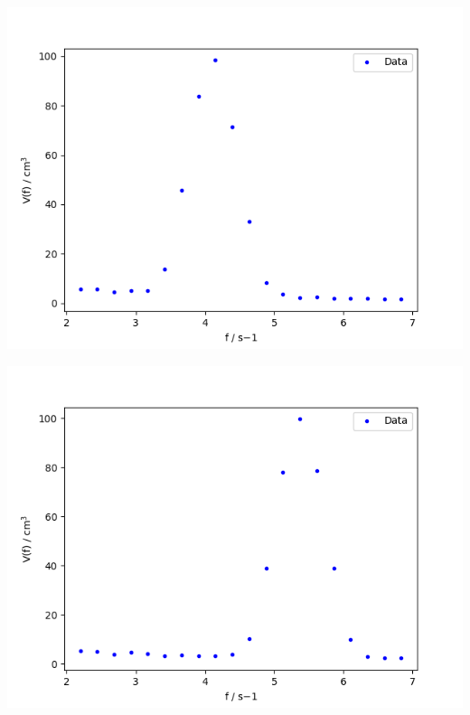 \documentclass[11pt]{scrartcl}
\begin{document}
\begin{minipage}{\textwidth}
\begin{minipage}[t]{0.49\textwidth}
    \centering
    \includegraphics[width=\textwidth]{Unbelastet/fit_of_f_Vf.png}
    \label{fig:fourier_unbelastet}
\end{minipage}
\begin{minipage}[t]{0.49\textwidth}
    \centering
    \includegraphics[width=\textwidth]{Belastet/fit_of_f_Vf.png}
    \label{fig:fourier_belastet}
\end{minipage}
    \vspace{1em}
\end{minipage}
\end{document}
